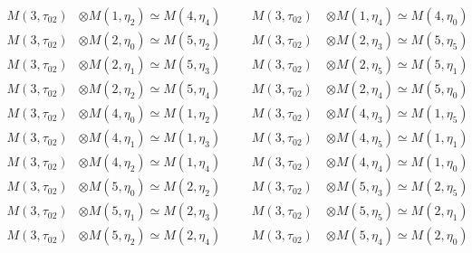 \begin{align*}
M(3,\tau_{02}) &\otimes M(1,\eta_{2}) \simeq M(4,\eta_{4}) &&& M(3,\tau_{02}) \
&\otimes M(1,\eta_{4}) \simeq M(4,\eta_{0})\\
M(3,\tau_{02}) &\otimes M(2,\eta_{0}) \simeq M(5,\eta_{2}) &&& M(3,\tau_{02}) \
&\otimes M(2,\eta_{3}) \simeq M(5,\eta_{5})\\
M(3,\tau_{02}) &\otimes M(2,\eta_{1}) \simeq M(5,\eta_{3}) &&& M(3,\tau_{02}) \
&\otimes M(2,\eta_{5}) \simeq M(5,\eta_{1})\\
M(3,\tau_{02}) &\otimes M(2,\eta_{2}) \simeq M(5,\eta_{4}) &&& M(3,\tau_{02}) \
&\otimes M(2,\eta_{4}) \simeq M(5,\eta_{0})\\
M(3,\tau_{02}) &\otimes M(4,\eta_{0}) \simeq M(1,\eta_{2}) &&& M(3,\tau_{02}) \
&\otimes M(4,\eta_{3}) \simeq M(1,\eta_{5})\\
M(3,\tau_{02}) &\otimes M(4,\eta_{1}) \simeq M(1,\eta_{3}) &&& M(3,\tau_{02}) \
&\otimes M(4,\eta_{5}) \simeq M(1,\eta_{1})\\
M(3,\tau_{02}) &\otimes M(4,\eta_{2}) \simeq M(1,\eta_{4}) &&& M(3,\tau_{02}) \
&\otimes M(4,\eta_{4}) \simeq M(1,\eta_{0})\\
M(3,\tau_{02}) &\otimes M(5,\eta_{0}) \simeq M(2,\eta_{2}) &&& M(3,\tau_{02}) \
&\otimes M(5,\eta_{3}) \simeq M(2,\eta_{5})\\
M(3,\tau_{02}) &\otimes M(5,\eta_{1}) \simeq M(2,\eta_{3}) &&& M(3,\tau_{02}) \
&\otimes M(5,\eta_{5}) \simeq M(2,\eta_{1})\\
M(3,\tau_{02}) &\otimes M(5,\eta_{2}) \simeq M(2,\eta_{4}) &&& M(3,\tau_{02}) \
&\otimes M(5,\eta_{4}) \simeq M(2,\eta_{0})\\
\end{align*}

